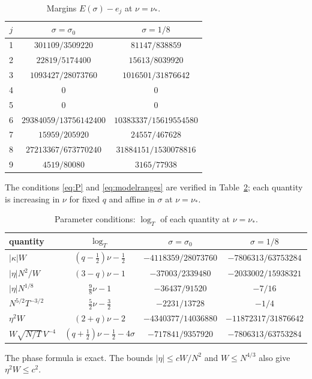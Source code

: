 \documentclass[11pt]{amsart}
\theoremstyle{definition}
\theoremstyle{remark}
\numberwithin{equation}{section}
\begin{document}
\begin{table}[ht]
\centering
\caption{Margins $E(\sigma)-e_j$ at $\nu=\nu_*$.}\label{tab:margins}
\begin{tabular}{ccc}
\toprule
$j$ & $\sigma=\sigma_0$ & $\sigma=1/8$\\
\midrule
1 & $301109/3509220$ & $81147/838859$\\
2 & $22819/5174400$ & $15613/8039920$\\
3 & $1093427/28073760$ & $1016501/31876642$\\
4 & $0$ & $0$\\
5 & $0$ & $0$\\
6 & $29384059/13756142400$ & $10383337/15619554580$\\
7 & $15959/205920$ & $24557/467628$\\
8 & $27213367/673770240$ & $31884151/1530078816$\\
9 & $4519/80080$ & $3165/77938$\\
\bottomrule
\end{tabular}
\end{table}

The conditions \eqref{eq:P} and \eqref{eq:modelranges} are verified in Table~\ref{tab:cond}; each quantity is increasing in $\nu$ for fixed $q$ and affine in $\sigma$ at $\nu=\nu_*$.

\begin{table}[ht]
\centering
\caption{Parameter conditions: $\log_T$ of each quantity at $\nu=\nu_*$.}\label{tab:cond}
\begin{tabular}{lccc}
\toprule
quantity & $\log_T$ & $\sigma=\sigma_0$ & $\sigma=1/8$\\
\midrule
$|\kappa|W$ & $(q-\frac12)\nu-\frac12$ & $-4118359/28073760$ & $-7806313/63753284$\\
$|\eta|N^2/W$ & $(3-q)\nu-1$ & $-37003/2339480$ & $-2033002/15938321$\\
$|\eta|N^{1/8}$ & $\frac98\nu-1$ & $-36437/91520$ & $-7/16$\\
$N^{5/2}T^{-3/2}$ & $\frac52\nu-\frac32$ & $-2231/13728$ & $-1/4$\\
$\eta^2W$ & $(2+q)\nu-2$ & $-4340377/14036880$ & $-11872317/31876642$\\
$W\sqrt{N/T}\,V^{-4}$ & $(q+\frac12)\nu-\frac12-4\sigma$ & $-717841/9357920$ & $-7806313/63753284$\\
\bottomrule
\end{tabular}
\end{table}

The phase formula is exact. The bounds $|\eta|\le cW/N^2$ and $W\le N^{4/3}$ also give $\eta^2W\le c^2$.
\end{document}
